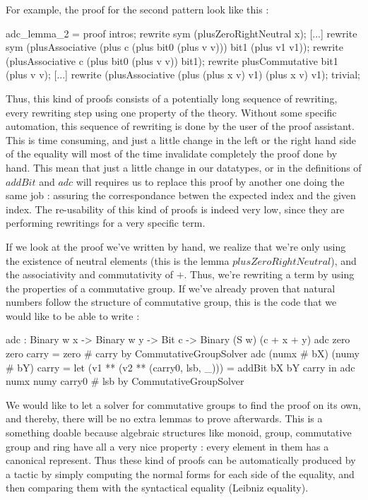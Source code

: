 For example, the proof for the second pattern look like this :
\begin{code}[caption=Proof by hand of the correspondence between expected and provided types for the second line of the definition of adc, captionpos=b, label=lst1:haskell2]
adc_lemma_2 = proof {
    intros;
    rewrite sym (plusZeroRightNeutral x);
    [...]
    rewrite sym (plusAssociative (plus c (plus bit0 (plus v v))) bit1 (plus v1 v1));
    rewrite (plusAssociative c (plus bit0 (plus v v)) bit1);
    rewrite plusCommutative bit1 (plus v v);
    [...]
    rewrite (plusAssociative (plus (plus x v) v1) (plus x v) v1);
    trivial;
}
\end{code}

Thus, this kind of proofs consists of a potentially long sequence of rewriting, every rewriting step using one property of the theory. Without some specific automation, this sequence of rewriting is done by the user of the proof assistant. This is time consuming, and just a little change in the left or the right hand side of the equality will most of the time invalidate completely the proof done by hand. This mean that just a little change in our datatypes, or in the definitions of $addBit$ and $adc$ will requires us to replace this proof by another one doing the same job : assuring the correspondance betwen the expected index and the given index. The re-usability of this kind of proofs is indeed very low, since they are performing rewritings for a very specific term.

If we look at the proof we've written by hand, we realize that we're only using the existence of neutral elements (this is the lemma $plusZeroRightNeutral$), and the associativity and commutativity of $+$. Thus, we're rewriting a term by using the properties of a commutative group.
If we've already proven that natural numbers follow the structure of commutative group, this is the code that we would like to be able to write :

\begin{code}[caption=Code we'd like to write for the addition of two binary numbers, captionpos=b, label=lst1:haskell2]
adc : Binary w x -> Binary w y -> Bit c 
     -> Binary (S w) (c + x + y)
adc zero zero carry = zero # carry 
        by CommutativeGroupSolver
adc (numx # bX) (numy # bY) carry
   = let (v1 ** (v2 ** (carry0, lsb, _))) = 
      addBit bX bY carry in
          adc numx numy carry0 # lsb 
        by CommutativeGroupSolver
\end{code}
We would like to let a solver for commutative groups to find the proof on its own, and thereby, there will be no extra lemmas to prove afterwards.
This is a something doable because algebraic structures like monoid, group, commutative group and ring have all a very nice property : every element in them has a canonical represent. Thus these kind of proofs can be automatically produced by a tactic by simply computing the normal forms for each side of the equality, and then comparing them with the syntactical equality (Leibniz equality).

